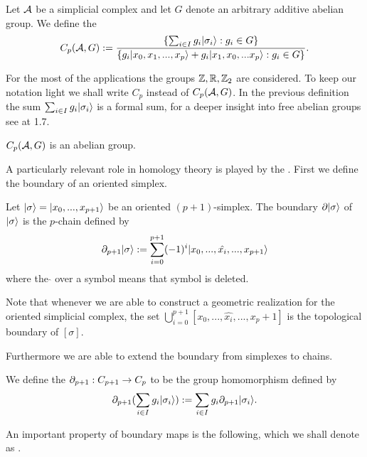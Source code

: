 \documentclass[../1.tex]{subfiles}
\begin{document}
    \begin{defn}
        Let $\mathcal{A}$ be a simplicial complex and let $G$ denote an arbitrary additive abelian group. We define the  
        \[ C_p(\mathcal{A},G) := \frac{\{ \sum_{i \in I} g_i | \sigma_i \rangle : g_i \in G \}}{\{g_i| x_0,x_1,...,x_p \rangle+g_i| x_1,x_0,...x_p \rangle : g_i \in G\} }.\]
    \end{defn}

    For the most of the applications the groups $\mathbb{Z},\mathbb{R},\mathbb{Z}_2$ are considered. To keep our notation light we shall write $C_p$ instead of $C_p(\mathcal{A},G)$.
    In the previous definition the sum $\sum_{i \in I} g_i | \sigma_i \rangle$ is a formal sum, for a deeper insight into free abelian groups see \cite{lang} at 1.7.

    \begin{prop}
        $C_p(\mathcal{A},G)$ is an abelian group.
    \end{prop}

    A particularly relevant role in homology theory is played by the . First we define the boundary of an oriented simplex.

    \begin{defn}
        Let $| \sigma \rangle = | x_0,...,x_{p+1} \rangle$ be an oriented $(p+1)$-simplex. The boundary $\partial| \sigma \rangle$ of $| \sigma \rangle$ is the $p$-chain
        defined by \[ \partial_{p+1}| \sigma \rangle := \sum_{i = 0}^{p+1}(-1)^i| x_0,...,\hat{x_i},...,x_{p+1} \rangle\]
        where the  $\hat{}$  over a symbol means that symbol is deleted.
    \end{defn}

    \begin{rem}
        Note that whenever we are able to construct a geometric realization for the oriented simplicial complex, the set $\bigcup_{i = 0}^{p+1}[x_0,...,\hat{x_i},...,x_p+1]$
        is the topological boundary of $[\sigma]$.
    \end{rem}

    Furthermore we are able to extend the boundary from simplexes to chains.
    
    \begin{defn}
        We define the  $\partial_{p+1} : C_{p+1} \to C_p$ to be the group homomorphism defined by
        \[ \partial_{p+1}(\sum_{i \in I}g_i| \sigma_i \rangle) := \sum_{i \in I}g_i\partial_{p+1}| \sigma_i \rangle .\]
    \end{defn}

    An important property of boundary maps is the following, which we shall denote as .
\end{document}
